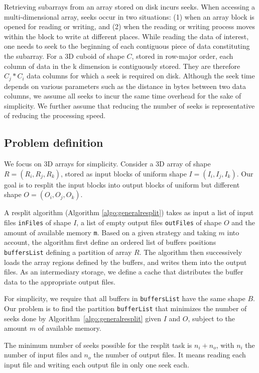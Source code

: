 \documentclass[conference]{IEEEtran}
\begin{document}
Retrieving subarrays from an array stored on disk incurs seeks. When accessing a
multi-dimensional array, seeks occur in two situations: (1) when an array block
is opened for reading or writing, and (2) when the reading or writing process
moves within the block to write at different places. While reading the data of
interest, one needs to seek to the beginning of each contiguous piece of data
constituting the subarray. For a 3D cuboid of shape $C$, stored in row-major order,
each column of data in the k dimension is contiguously stored. They are therefore
$C_j * C_i$ data columns for which a seek is required on disk. Although the seek
time depends on various parameters such as the distance in bytes between two
data columns, we assume all seeks to incur the same time overhead for the sake
of simplicity. We further assume that reducing the number of seeks is
representative of reducing the processing speed.

\subsection{Problem definition}
We focus on 3D arrays for simplicity. Consider a 3D array of shape $R =
(R_i, R_j, R_k)$, stored as input blocks of uniform shape $I =
(I_i, I_j, I_k)$. Our goal is to resplit the input blocks into output
blocks of uniform but different shape $O = (O_i, O_j, O_k)$.

A resplit algorithm (Algorithm \ref{algo:generalresplit}) takes as input a
list of input files \texttt{inFiles} of shape $I$, a list of empty output
files \texttt{outFiles} of shape $O$ and the amount of available memory
\texttt{m}. Based on a given strategy and taking $m$ into account, the
algorithm first define an ordered list of buffers positions \texttt{buffersList}
defining a partition of array $R$. The algorithm then successively loads the array
regions defined by the buffers, and writes them into the output files. As an
intermediary storage, we define a cache that distributes the buffer data to the
appropriate output files.

For simplicity, we require that all buffers in \texttt{buffersList} have
the same shape $B$. Our problem is to find the partition \texttt{bufferList}
that minimizes the number of seeks done by Algorithm~\ref{algo:generalresplit}
given $I$ and $O$, subject to the amount $m$ of available memory.

The minimum number of seeks possible for the resplit task is $n_i + n_o$, with
$n_i$ the number of input files and $n_o$ the number of output files. It means
reading each input file and writing each output file in only one seek each.
\end{document}
